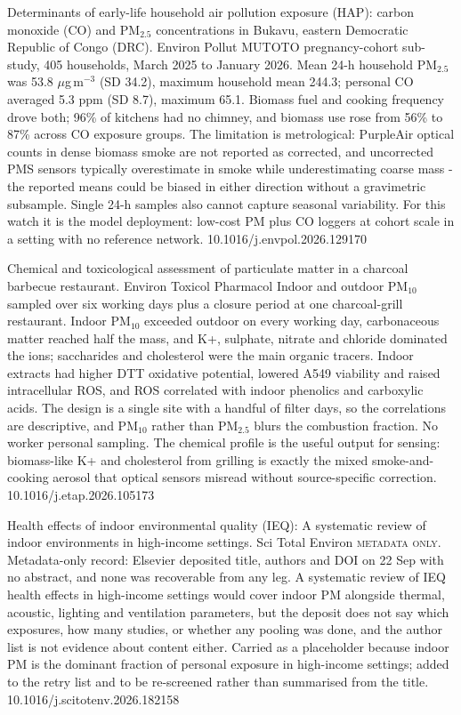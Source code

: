 \documentclass[10pt]{article}
\begin{document}

{Determinants of early-life household air pollution exposure (HAP): carbon monoxide (CO) and PM$_{2.5}$ concentrations in Bukavu, eastern Democratic Republic of Congo (DRC).}
{Environ Pollut}
{MUTOTO pregnancy-cohort sub-study, 405 households, March 2025 to January 2026. Mean 24-h household PM$_{2.5}$ was 53.8 $\mu$g\,m$^{-3}$ (SD 34.2), maximum household mean 244.3; personal CO averaged 5.3 ppm (SD 8.7), maximum 65.1. Biomass fuel and cooking frequency drove both; 96\% of kitchens had no chimney, and biomass use rose from 56\% to 87\% across CO exposure groups. The limitation is metrological: PurpleAir optical counts in dense biomass smoke are not reported as corrected, and uncorrected PMS sensors typically overestimate in smoke while underestimating coarse mass - the reported means could be biased in either direction without a gravimetric subsample. Single 24-h samples also cannot capture seasonal variability. For this watch it is the model deployment: low-cost PM plus CO loggers at cohort scale in a setting with no reference network.}
{10.1016/j.envpol.2026.129170}

{Chemical and toxicological assessment of particulate matter in a charcoal barbecue restaurant.}
{Environ Toxicol Pharmacol}
{Indoor and outdoor PM$_{10}$ sampled over six working days plus a closure period at one charcoal-grill restaurant. Indoor PM$_{10}$ exceeded outdoor on every working day, carbonaceous matter reached half the mass, and K+, sulphate, nitrate and chloride dominated the ions; saccharides and cholesterol were the main organic tracers. Indoor extracts had higher DTT oxidative potential, lowered A549 viability and raised intracellular ROS, and ROS correlated with indoor phenolics and carboxylic acids. The design is a single site with a handful of filter days, so the correlations are descriptive, and PM$_{10}$ rather than PM$_{2.5}$ blurs the combustion fraction. No worker personal sampling. The chemical profile is the useful output for sensing: biomass-like K+ and cholesterol from grilling is exactly the mixed smoke-and-cooking aerosol that optical sensors misread without source-specific correction.}
{10.1016/j.etap.2026.105173}

{Health effects of indoor environmental quality (IEQ): A systematic review of indoor environments in high-income settings.}
{Sci Total Environ}
{\textsc{metadata only.} Metadata-only record: Elsevier deposited title, authors and DOI on 22 Sep with no abstract, and none was recoverable from any leg. A systematic review of IEQ health effects in high-income settings would cover indoor PM alongside thermal, acoustic, lighting and ventilation parameters, but the deposit does not say which exposures, how many studies, or whether any pooling was done, and the author list is not evidence about content either. Carried as a placeholder because indoor PM is the dominant fraction of personal exposure in high-income settings; added to the retry list and to be re-screened rather than summarised from the title.}
{10.1016/j.scitotenv.2026.182158}
\end{document}
